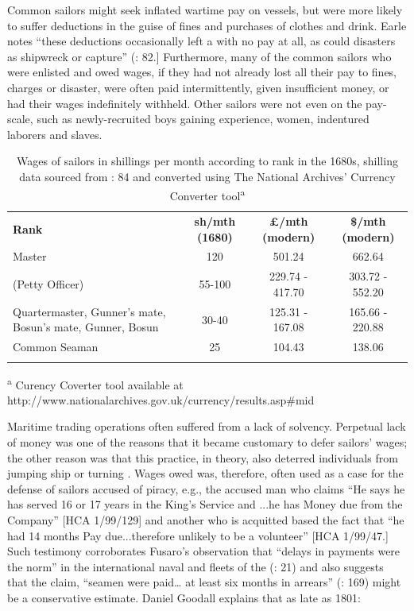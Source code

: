 Common sailors might seek inflated wartime pay on  vessels, but were more likely to suffer deductions in the guise of fines and purchases of clothes and drink. Earle notes “these deductions occasionally left a  with no pay at all, as could disasters as shipwreck or capture” (\citeyear*{Earle1889}: 82.] Furthermore, many of the common sailors who were enlisted and owed wages, if they had not already lost all their pay to fines, charges or disaster, were often paid intermittently, given insufficient money, or had their wages indefinitely withheld. Other sailors were not even on the pay-scale, such as newly-recruited boys gaining experience, women, indentured laborers and slaves. 

\begin{table}
\caption{\label{tab:key:3.2} Wages of sailors in shillings per month according to rank in the 1680s, shilling data sourced from \citealt{Earle1998}: 84 and converted using The National Archives’ Currency Converter tool\textsuperscript{a}}

\begin{tabularx}{\textwidth}{Qccc}
\lsptoprule

\textbf{Rank} & \textbf{sh/mth} \textbf{(1680)} & \textbf{£/mth} \textbf{(modern)} & \textbf{\$/mth} \textbf{(modern)}\\
Master & 120 & 501.24 & 662.64\\
\midrule
{} (Petty Officer) & 55-100 & 229.74 - 417.70 & 303.72 - 552.20\\
Quartermaster, Gunner’s mate, Bosun’s mate, Gunner, Bosun & 30-40 & 125.31 - 167.08 & 165.66 - 220.88\\
Common Seaman & 25 & 104.43 & 138.06\\
\lspbottomrule
\end{tabularx}\end{table}
\textsuperscript{a} Curency Coverter tool available at http://www.nationalarchives.gov.uk/currency/results.asp\#mid

Maritime trading operations often suffered from a lack of solvency. Perpetual lack of money was one of the reasons that it became customary to defer sailors’ wages; the other reason was that this practice, in theory, also deterred individuals from jumping ship or turning . Wages owed was, therefore, often used as a case for the defense of sailors accused of piracy, e.g., the accused man who claims “He says he has served 16 or 17 years in the King’s Service and ...he has Money due from the Company” [HCA 1/99/129] and another who is acquitted based the fact that “he had 14 months Pay due...therefore unlikely to be a volunteer” [HCA 1/99/47.] Such testimony corroborates Fusaro’s observation that “delays in payments were the norm” in the international naval and  fleets of the  (\citeyear*{Fusaro2015}: 21) and also suggests that the claim, “seamen were paid… at least six months in arrears” (\citealt{AdkinsAdkins2008}: 169) might be a conservative estimate. Daniel Goodall explains that as late as 1801:

